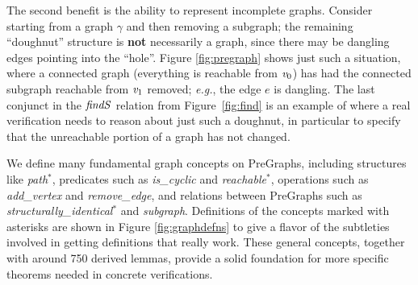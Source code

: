 The second benefit is the ability to represent incomplete graphs.
Consider starting from a graph $\gamma$ and then removing a subgraph; the remaining
``doughnut'' structure is \textbf{not} necessarily a graph, since there may be dangling
edges pointing into the ``hole''.  Figure \ref{fig:pregraph} shows just such a situation,
where a connected graph (everything is reachable from $\mathit{v}_0$) has had the connected
subgraph reachable from $\mathit{v}_1$ removed; \emph{e.g.}, the edge $e$ is dangling.
The last conjunct in the $\mathit{findS}$ relation from Figure~\ref{fig:find} is an example
of where a real verification needs to reason about just such a doughnut, in particular
to specify that the unreachable portion of a graph has not changed.  


We define many fundamental graph concepts on PreGraphs,
including structures like \emph{path}$^{*}$, predicates
such as \emph{is\_cyclic} and \emph{reachable}$^{*}$,
operations such as \emph{add\_vertex}
and \emph{remove\_edge}, and relations between PreGraphs such
as \emph{structurally\_identical}$^{*}$ and \emph{subgraph}.
Definitions of the concepts marked with asterisks are
shown in Figure \ref{fig:graphdefns} to give a flavor
of the subtleties involved in getting definitions that 
really work.
These general concepts, together with around 750 derived lemmas,
provide a
solid foundation for more specific theorems needed in concrete
verifications.

